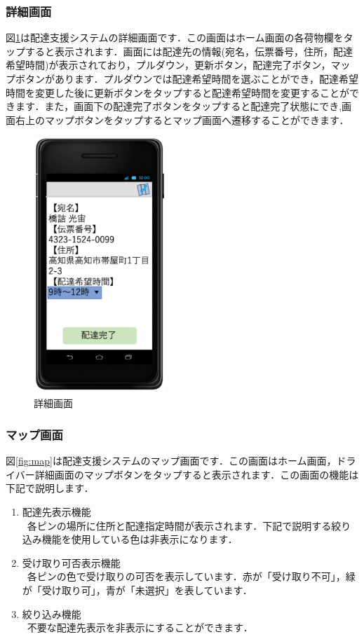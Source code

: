 \documentclass[a4j,titlepage]{jarticle}
\begin{document}
\subsubsection{詳細画面}
図\ref{fig:driver_details}は配達支援システムの詳細画面です．この画面はホーム画面の各荷物欄をタップすると表示されます．画面には配達先の情報(宛名，伝票番号，住所，配達希望時間)が表示されており，プルダウン，更新ボタン，配達完了ボタン，マップボタンがあります．プルダウンでは配達希望時間を選ぶことができ，配達希望時間を変更した後に更新ボタンをタップすると配達希望時間を変更することができます．また，画面下の配達完了ボタンをタップすると配達完了状態にでき,画面右上のマップボタンをタップするとマップ画面へ遷移することができます．
\begin{figure}[htbp]
 \begin{center}
  \includegraphics[width=50mm]{driver_details.pdf}
	\caption{詳細画面}
	\label{fig:driver_details}
 \end{center}

\end{figure}




\subsubsection{マップ画面}
図\ref{fig:map}は配達支援システムのマップ画面です．この画面はホーム画面，ドライバー詳細画面のマップボタンをタップすると表示されます．この画面の機能は下記で説明します．
\begin{enumerate}
	\item 配達先表示機能\\
	 \ 各ピンの場所に住所と配達指定時間が表示されます．下記で説明する絞り込み機能を使用している色は非表示になります．
	\item 受け取り可否表示機能\\
	 \ 各ピンの色で受け取りの可否を表示しています．赤が「受け取り不可」，緑が「受け取り可」，青が「未選択」を表しています．
	\item 絞り込み機能\\
   \ 不要な配達先表示を非表示にすることができます．

\end{enumerate}
\end{document}
